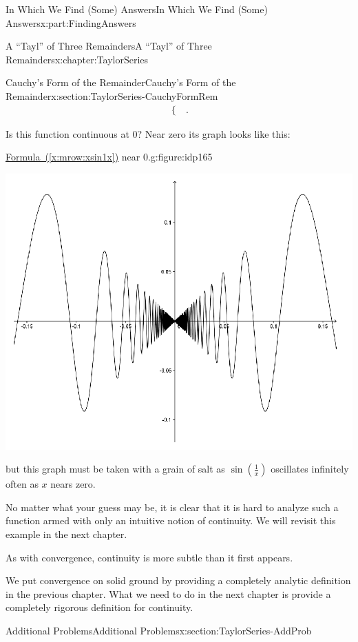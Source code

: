 \documentclass[oneside,10pt,]{book}
\newcommand{\xreffont}{\relax}
\numberwithin{equation}{section}
\begin{document}
\begin{partptx}{In Which We Find (Some) Answers}{}{In Which We Find (Some) Answers}{}{}{x:part:FindingAnswers}
\begin{chapterptx}{A ``Tayl'' of Three Remainders}{}{A ``Tayl'' of Three Remainders}{}{}{x:chapter:TaylorSeries}
\begin{sectionptx}{Cauchy's Form of the Remainder}{}{Cauchy's Form of the Remainder}{}{}{x:section:TaylorSeries-CauchyFormRem}
\begin{align}
\begin{cases}
\end{cases} \text{.}\label{x:mrow:xsin1x}
\end{align}
%
\par
Is this function continuous at 0?  Near zero its graph looks like this:%
\begin{figureptx}{\hyperref[x:mrow:xsin1x]{Formula~({\xreffont\ref{x:mrow:xsin1x}})} near \(0\).}{g:figure:idp165}{}%
\begin{image}{0}{1}{0}%
\includegraphics[width=\linewidth]{images/Ch5fig4.png}
\end{image}%
\tcblower
\end{figureptx}%
but this graph must be taken with a grain of salt as \(\sin
\left(\frac{1}{x}\right)\) oscillates infinitely often as \(x\) nears zero.%
\par
No matter what your guess may be, it is clear that it is hard to analyze such a function armed with only an intuitive notion of continuity.  We will revisit this example in the next chapter.%
\par
As with convergence, continuity is more subtle than it first appears.%
\par
We put convergence on solid ground by providing a completely analytic definition in the previous chapter.  What we need to do in the next chapter is provide a completely rigorous definition for continuity.%
\end{sectionptx}
%
%
\typeout{************************************************}
\typeout{************************************************}
%
\begin{sectionptx}{Additional Problems}{}{Additional Problems}{}{}{x:section:TaylorSeries-AddProb}

\end{sectionptx}
\end{chapterptx}
\end{partptx}
\end{document}
